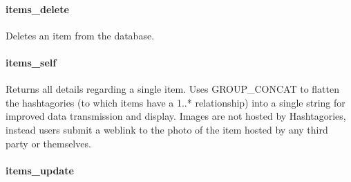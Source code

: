 \paragraph{items\_delete}\label{itemsux5fdelete}

Deletes an item from the database.

\begin{Shaded}
\begin{Highlighting}[]
  \NormalTok{(}\NormalTok{))}
       
\end{Highlighting}
\end{Shaded}

\paragraph{items\_self}\label{itemsux5fself}

Returns all details regarding a single item. Uses GROUP\_CONCAT to
flatten the hashtagories (to which items have a 1..* relationship) into
a single string for improved data transmission and display. Images are
not hosted by Hashtagories, instead users submit a weblink to the photo
of the item hosted by any third party or themselves.

\begin{Shaded}
\begin{Highlighting}[]
  \NormalTok{(}\NormalTok{))}
       \NormalTok{) } 
     
      
\end{Highlighting}
\end{Shaded}

\paragraph{items\_update}\label{itemsux5fupdate}


